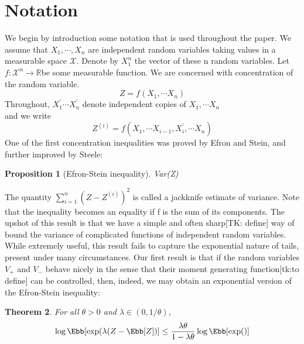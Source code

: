 \documentclass{article}
\theoremstyle{plain}
\newtheorem{theorem}{Theorem}[section]
\newtheorem{proposition}[theorem]{Proposition}
\begin{document}
\section{Notation}
We begin by introduction some notation that is used throughout the paper. We assume
that $X_1, \cdots , X_n$ are independent random variables taking values in a
measurable space $\mathcal{X}$. Denote by $X_1^n$ the vector of these n random
variables. Let $f: \mathcal{X}^n \rightarrow \mathbb{R} $be some measurable function.
We are concerned with concentration of the random variable. 
\begin{equation*}
Z = f(X_1, \cdots X_n) \end{equation*}
	 Throughout, $X_1^{'} \cdots X_n^{'}$ denote independent copies of $X_1, \cdots X_n$
	 \begin{equation*}
\end{equation*}and we write \begin{equation*} Z^{(i)} = f\left( X_1, \cdots X_{i-1}
, X^{'}_i, \cdots X_n\right)
\end{equation*}
One of the first concentration inequalities was proved by Efron and Stein, and
further improved by Steele:
\begin{proposition}[Efron-Stein inequality]
Var(Z) \lt {}  \left[ \sum_{i=1}^{n} \left( 
Z-Z^{(i)}\right)^2\right]
\end{proposition}
The quantity $\sum_{i=1}^{n} \left( 
Z-Z^{(i)}\right)^2$ is called a jackknife estimate of variance. 
Note that the inequality becomes an equality if f is the sum of its components. 
The upshot of this result is that we have a simple and often sharp[TK: define] way
of bound the variance of complicated functions of independent random variables. 
While extremely useful, this result fails to capture the exponential nature 
of tails, present under many circumstances.
Our first result is that if the random variables $V_+$ and $V_-$ behave nicely in the
sense that their moment generating function[tk:to define] can be controlled, then,
indeed, we may obtain an exponential version of the Efron-Stein inequality:
\begin{theorem} For all $\theta \gt 0$ and $\lambda \in (0,1/\theta)$,
$$\log \Ebb[\exp(\lambda(Z- \Ebb[Z])]\leq \dfrac{\lambda \theta}{1- \lambda \theta} \log \Ebb[\exp()]$$
\end{theorem}
\begin{equation*}
\end{equation*}\begin{equation*}
\end{equation*}
\end{document}
